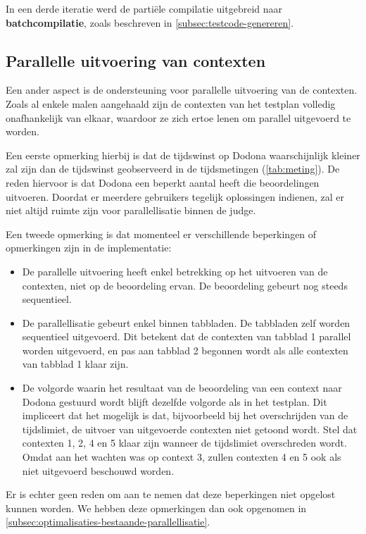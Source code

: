 In een derde iteratie werd de partiële compilatie uitgebreid naar \textbf{batchcompilatie}, zoals beschreven in \cref{subsec:testcode-genereren}.

\subsection{Parallelle uitvoering van contexten}\label{subsec:parallelle-uitvoering-van-contexten}

Een ander aspect is de ondersteuning voor parallelle uitvoering van de contexten.
Zoals al enkele malen aangehaald zijn de contexten van het testplan volledig onafhankelijk van elkaar, waardoor ze zich ertoe lenen om parallel uitgevoerd te worden.

Een eerste opmerking hierbij is dat de tijdswinst op Dodona waarschijnlijk kleiner zal zijn dan de tijdswinst geobserveerd in de tijdsmetingen (\cref{tab:meting}).
De reden hiervoor is dat Dodona een beperkt aantal  heeft die beoordelingen uitvoeren.
Doordat er meerdere gebruikers tegelijk oplossingen indienen, zal er niet altijd ruimte zijn voor parallellisatie binnen de judge.

Een tweede opmerking is dat momenteel er verschillende beperkingen of opmerkingen zijn in de implementatie:

\begin{itemize}
    \item De parallelle uitvoering heeft enkel betrekking op het uitvoeren van de contexten, niet op de beoordeling ervan.
    De beoordeling gebeurt nog steeds sequentieel.
    \item De parallellisatie gebeurt enkel binnen tabbladen.
    De tabbladen zelf worden sequentieel uitgevoerd.
    Dit betekent dat de contexten van tabblad 1 parallel worden uitgevoerd, en pas aan tabblad 2 begonnen wordt als alle contexten van tabblad 1 klaar zijn.
    \item De volgorde waarin het resultaat van de beoordeling van een context naar Dodona gestuurd wordt blijft dezelfde volgorde als in het testplan.
    Dit impliceert dat het mogelijk is dat, bijvoorbeeld bij het overschrijden van de tijdslimiet, de uitvoer van uitgevoerde contexten niet getoond wordt.
    Stel dat contexten 1, 2, 4 en 5 klaar zijn wanneer de tijdslimiet overschreden wordt.
    Omdat \tested{} aan het wachten was op context 3, zullen contexten 4 en 5 ook als niet uitgevoerd beschouwd worden.
\end{itemize}

Er is echter geen reden om aan te nemen dat deze beperkingen niet opgelost kunnen worden.
We hebben deze opmerkingen dan ook opgenomen in \cref{subsec:optimalisaties-bestaande-parallellisatie}.

